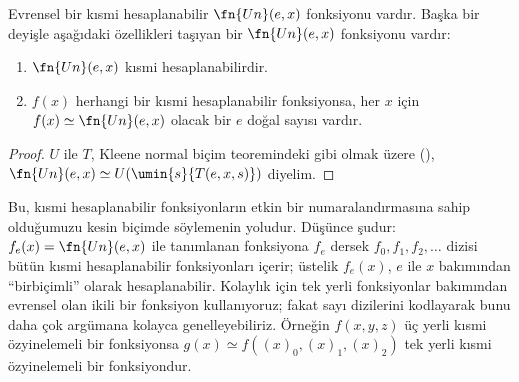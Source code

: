 \documentclass[../../../include/open-logic-section]{subfiles}
\begin{document}

\begin{thm}
Evrensel bir kısmi hesaplanabilir $\fn{Un}(e,x)$ fonksiyonu vardır. Başka bir
deyişle aşağıdaki özellikleri taşıyan bir $\fn{Un}(e,x)$ fonksiyonu vardır:
\begin{enumerate}
\item $\fn{Un}(e,x)$ kısmi hesaplanabilirdir.
\item $f(x)$ herhangi bir kısmi hesaplanabilir fonksiyonsa, her $x$ için
  $f(x)\simeq\fn{Un}(e,x)$ olacak bir $e$ doğal sayısı vardır.
\end{enumerate}
\end{thm}

\begin{proof}
$U$ ile $T$, Kleene normal biçim teoremindeki gibi olmak üzere
(),
$\fn{Un}(e,x)\simeq U(\umin{s}{T(e,x,s)})$ diyelim.
\end{proof}

\begin{explain}
Bu, kısmi hesaplanabilir fonksiyonların etkin bir numaralandırmasına sahip
olduğumuzu kesin biçimde söylemenin yoludur. Düşünce şudur:
$f_e(x)=\fn{Un}(e,x)$ ile tanımlanan fonksiyona $f_e$ dersek
$f_0,f_1,f_2,\dots$ dizisi bütün kısmi hesaplanabilir fonksiyonları içerir;
üstelik $f_e(x)$, $e$ ile $x$ bakımından ``birbiçimli'' olarak
hesaplanabilir. Kolaylık için tek yerli fonksiyonlar bakımından evrensel olan
ikili bir fonksiyon kullanıyoruz; fakat sayı dizilerini kodlayarak bunu daha
çok argümana kolayca genelleyebiliriz. Örneğin $f(x,y,z)$ üç yerli kısmi
özyinelemeli bir fonksiyonsa
$g(x)\simeq f((x)_0,(x)_1,(x)_2)$ tek yerli kısmi özyinelemeli bir
fonksiyondur.
\end{explain}
\end{document}
